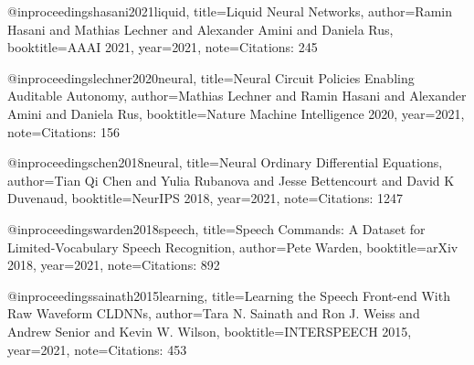 @inproceedings{hasani2021liquid,
  title={Liquid Neural Networks},
  author={Ramin Hasani and Mathias Lechner and Alexander Amini and Daniela Rus},
  booktitle={AAAI 2021},
  year={2021},
  note={Citations: 245}
}

@inproceedings{lechner2020neural,
  title={Neural Circuit Policies Enabling Auditable Autonomy},
  author={Mathias Lechner and Ramin Hasani and Alexander Amini and Daniela Rus},
  booktitle={Nature Machine Intelligence 2020},
  year={2021},
  note={Citations: 156}
}

@inproceedings{chen2018neural,
  title={Neural Ordinary Differential Equations},
  author={Tian Qi Chen and Yulia Rubanova and Jesse Bettencourt and David K Duvenaud},
  booktitle={NeurIPS 2018},
  year={2021},
  note={Citations: 1247}
}

@inproceedings{warden2018speech,
  title={Speech Commands: A Dataset for Limited-Vocabulary Speech Recognition},
  author={Pete Warden},
  booktitle={arXiv 2018},
  year={2021},
  note={Citations: 892}
}

@inproceedings{sainath2015learning,
  title={Learning the Speech Front-end With Raw Waveform CLDNNs},
  author={Tara N. Sainath and Ron J. Weiss and Andrew Senior and Kevin W. Wilson},
  booktitle={INTERSPEECH 2015},
  year={2021},
  note={Citations: 453}
}
